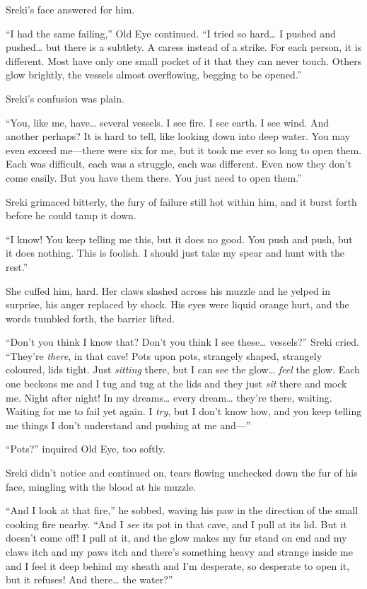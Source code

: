 Sreki's face answered for him.

``I had the same failing,'' Old Eye continued. ``I tried so hard\ldots{} I pushed and pushed\ldots{} but there is a subtlety. A caress instead of a strike. For each person, it is different. Most have only one small pocket of it that they can never touch. Others glow brightly, the vessels almost overflowing, begging to be opened.''

Sreki's confusion was plain.

``You, like me, have\ldots{} several vessels. I see fire. I see earth. I see wind. And another perhaps? It is hard to tell, like looking down into deep water. You may even exceed me---there were six for me, but it took me ever so long to open them. Each was difficult, each was a struggle, each was different. Even now they don't come easily. But you have them there. You just need to open them.''

Sreki grimaced bitterly, the fury of failure still hot within him, and it burst forth before he could tamp it down.

``I know! You keep telling me this, but it does no good. You push and push, but it does nothing. This is foolish. I should just take my spear and hunt with the rest.''

She cuffed him, hard. Her claws slashed across his muzzle and he yelped in surprise, his anger replaced by shock. His eyes were liquid orange hurt, and the words tumbled forth, the barrier lifted.

``Don't you think I know that? Don't you think I see these\ldots{} vessels?'' Sreki cried. ``They're \emph{there}, in that cave! Pots upon pots, strangely shaped, strangely coloured, lids tight. Just \emph{sitting} there, but I can see the glow\ldots{} \emph{feel} the glow. Each one beckons me and I tug and tug at the lids and they just \emph{sit} there and mock me. Night after night! In my dreams\ldots{} every dream\ldots{} they're there, waiting. Waiting for me to fail yet again. I \emph{try}, but I don't know how, and you keep telling me things I don't understand and pushing at me and---''

``Pots?'' inquired Old Eye, too softly.

Sreki didn't notice and continued on, tears flowing unchecked down the fur of his face, mingling with the blood at his muzzle.

``And I look at that fire,'' he sobbed, waving his paw in the direction of the small cooking fire nearby. ``And I \emph{see} its pot in that cave, and I pull at its lid. But it doesn't come off! I pull at it, and the glow makes my fur stand on end and my claws itch and my paws itch and there's something heavy and strange inside me and I feel it deep behind my sheath and I'm desperate, so desperate to open it, but it refuses! And there\ldots{} the water?''

